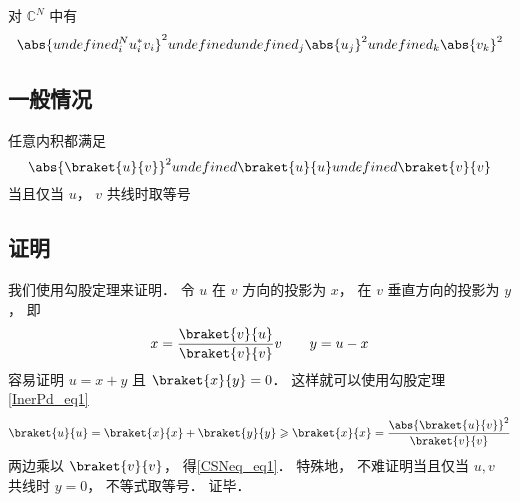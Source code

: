 
对 $\mathbb C^N$ 中有
\begin{equation}
\abs{undefined_i^N u_i^* v_i}^2 undefined undefined_j \abs{u_j}^2 undefined_k \abs{v_k}^2
\end{equation}

\subsection{一般情况}
任意内积都满足
\begin{equation}\label{CSNeq_eq1}
\abs{\braket{u}{v}}^2 undefined \braket{u}{u} undefined \braket{v}{v}
\end{equation}
当且仅当 $u$， $v$ 共线时取等号

\subsection{证明}
我们使用勾股定理来证明． 令 $u$ 在 $v$ 方向的投影为 $x$， 在 $v$ 垂直方向的投影为 $y$， 即
\begin{equation}
x = \frac{\braket{v}{u}}{\braket{v}{v}} v \qquad y = u - x
\end{equation}
容易证明 $u = x + y$ 且 $\braket{x}{y} = 0$． 这样就可以使用勾股定理\autoref{InerPd_eq1}
\begin{equation}
\braket{u}{u} = \braket{x}{x} + \braket{y}{y} \geqslant \braket{x}{x} = \frac{\abs{\braket{u}{v}}^2}{\braket{v}{v}}
\end{equation}
两边乘以 $\braket{v}{v}$， 得\autoref{CSNeq_eq1}． 特殊地， 不难证明当且仅当 $u, v$ 共线时 $y = 0$， 不等式取等号． 证毕．
